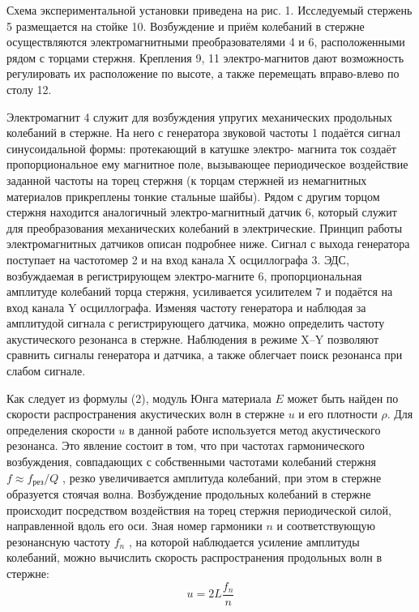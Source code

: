 \documentclass[a4paper, 10pt, twocolumn]{article}
\begin{document}
\par Схема экспериментальной установки приведена на рис. 1. Исследуемый
стержень 5 размещается на стойке 10. Возбуждение и приём колебаний в
стержне осуществляются электромагнитными преобразователями 4 и 6,
расположенными рядом с торцами стержня. Крепления 9, 11 электро-магнитов дают возможность регулировать их расположение по высоте, а
также перемещать вправо-влево по столу 12. \\

\par Электромагнит 4 служит для возбуждения упругих механических продольных колебаний в стержне. На него с генератора звуковой частоты 1 подаётся сигнал синусоидальной формы: протекающий в катушке электро-
магнита ток создаёт пропорциональное ему магнитное поле, вызывающее
периодическое воздействие заданной частоты на торец стержня (к торцам
стержней из немагнитных материалов прикреплены тонкие стальные
шайбы). Рядом с другим торцом стержня находится аналогичный электро-магнитный датчик 6, который служит для преобразования механических
колебаний в электрические. Принцип работы электромагнитных датчиков
описан подробнее ниже.
Сигнал с выхода генератора поступает на частотомер 2 и на вход
канала X осциллографа 3. ЭДС, возбуждаемая в регистрирующем электро-магните 6, пропорциональная амплитуде колебаний торца стержня, усиливается усилителем 7 и подаётся на вход канала Y осциллографа.
Изменяя частоту генератора и наблюдая за амплитудой сигнала с регистрирующего датчика, можно определить частоту акустического резонанса
в стержне. Наблюдения в режиме X–Y позволяют сравнить сигналы генератора и датчика, а также облегчает поиск резонанса при слабом сигнале.

\par Как следует из формулы (2), модуль Юнга материала $E$ может быть
найден по скорости распространения акустических волн в стержне $u$ и его
плотности $\rho$. Для определения скорости $u$ в данной работе используется
метод акустического резонанса. Это явление состоит в том, что при частотах гармонического возбуждения, совпадающих с собственными частотами
колебаний стержня $f \approx f_\text{рез}/Q$ , резко увеличивается амплитуда колебаний, при
этом в стержне образуется стоячая волна.
Возбуждение продольных колебаний в стержне происходит посредством воздействия на торец стержня периодической силой, направленной
вдоль его оси. Зная номер гармоники $n$ и соответствующую резонансную
частоту $f_n$ , на которой наблюдается усиление амплитуды колебаний,
можно вычислить скорость распространения продольных волн в стержне:
\begin{equation}
    u = 2L\frac{f_n}{n}
\end{equation}
\end{document}
